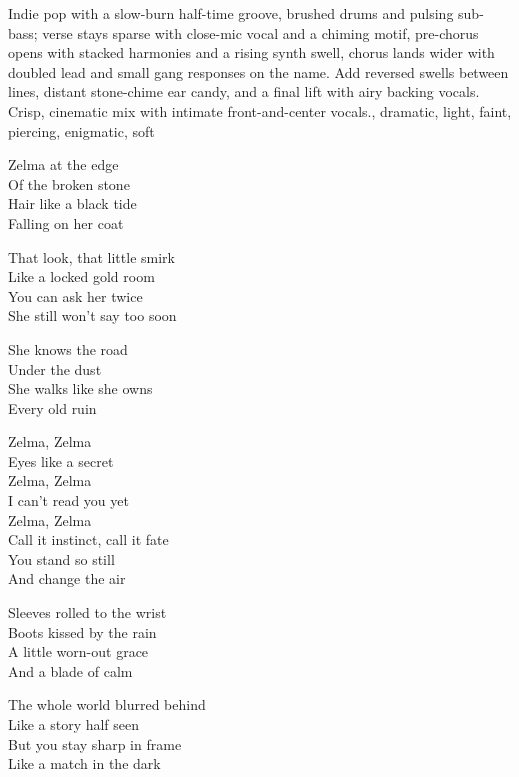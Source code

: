 
\begin{notes}
\end{notes}
\begin{style}
Indie pop with a slow-burn half-time groove, brushed drums and pulsing sub-bass; verse stays sparse with close-mic vocal and a chiming motif, pre-chorus opens with stacked harmonies and a rising synth swell, chorus lands wider with doubled lead and small gang responses on the name. %
Add reversed swells between lines, distant stone-chime ear candy, and a final lift with airy backing vocals. %
Crisp, cinematic mix with intimate front-and-center vocals., dramatic, light, faint, piercing, enigmatic, soft
\end{style}
\begin{lyrics}
Zelma at the edge\\
Of the broken stone\\
Hair like a black tide\\
Falling on her coat

That look, that little smirk\\
Like a locked gold room\\
You can ask her twice\\
She still won't say too soon

She knows the road\\
Under the dust\\
She walks like she owns\\
Every old ruin

Zelma, Zelma\\
Eyes like a secret\\
Zelma, Zelma\\
I can't read you yet\\
Zelma, Zelma\\
Call it instinct, call it fate\\
You stand so still\\
And change the air

Sleeves rolled to the wrist\\
Boots kissed by the rain\\
A little worn-out grace\\
And a blade of calm

The whole world blurred behind\\
Like a story half seen\\
But you stay sharp in frame\\
Like a match in the dark


\end{lyrics}
